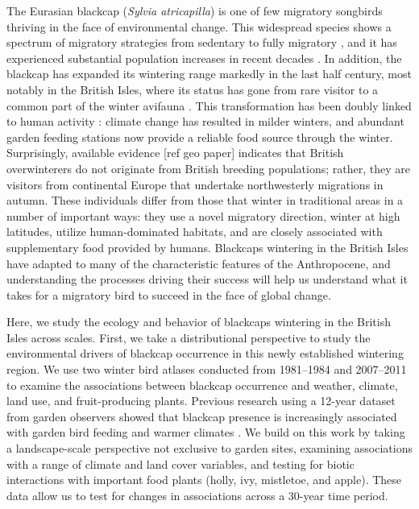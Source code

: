 \documentclass[a4paper, twoside]{templates/ociamthesis}
\begin{document}
The Eurasian blackcap (\emph{Sylvia atricapilla}) is one of few migratory songbirds thriving in the face of environmental change. This widespread species shows a spectrum of migratory strategies from sedentary to fully migratory \autocite{crampSylviaAtricapillaBlackcap1992}, and it has experienced substantial population increases in recent decades \autocite{ebcc/birdlife/rspb/csoTrendsCommonBirds2018}. In addition, the blackcap has expanded its wintering range markedly in the last half century, most notably in the British Isles, where its status has gone from rare visitor to a common part of the winter avifauna \autocite{bearhopAssortativeMatingMechanism2005,bertholdMigratoryBehaviourPopulation1988,bertholdRapidMicroevolutionMigratory1992,leachWinteringBlackcapsBritain1981}. This transformation has been doubly linked to human activity \autocite{plummerSupplementaryFeedingGardens2015}: climate change has resulted in milder winters, and abundant garden feeding stations now provide a reliable food source through the winter. Surprisingly, available evidence {[}ref geo paper{]} indicates that British overwinterers do not originate from British breeding populations; rather, they are visitors from continental Europe that undertake northwesterly migrations in autumn. These individuals differ from those that winter in traditional areas in a number of important ways: they use a novel migratory direction, winter at high latitudes, utilize human-dominated habitats, and are closely associated with supplementary food provided by humans. Blackcaps wintering in the British Isles have adapted to many of the characteristic features of the Anthropocene, and understanding the processes driving their success will help us understand what it takes for a migratory bird to succeed in the face of global change.

Here, we study the ecology and behavior of blackcaps wintering in the British Isles across scales. First, we take a distributional perspective to study the environmental drivers of blackcap occurrence in this newly established wintering region. We use two winter bird atlases conducted from 1981--1984 \autocite{blandBlackcap1986} and 2007--2011 \autocite{balmer2013bird} to examine the associations between blackcap occurrence and weather, climate, land use, and fruit-producing plants. Previous research using a 12-year dataset from garden observers showed that blackcap presence is increasingly associated with garden bird feeding and warmer climates \autocite{plummerSupplementaryFeedingGardens2015}. We build on this work by taking a landscape-scale perspective not exclusive to garden sites, examining associations with a range of climate and land cover variables, and testing for biotic interactions with important food plants (holly, ivy, mistletoe, and apple). These data allow us to test for changes in associations across a 30-year time period.
\end{document}
